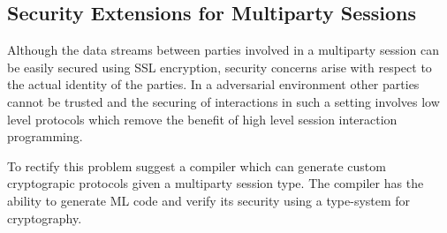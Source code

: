 \subsection*{Security Extensions for Multiparty Sessions}

Although the data streams between parties involved in a multiparty session can be easily secured using SSL encryption, security concerns arise with respect to the actual identity of the parties. In a adversarial environment other parties cannot be trusted and the securing of interactions in such a setting involves low level protocols which remove the benefit of high level session interaction programming. 

To rectify this problem \cite{crypto_mpst1, crypto_mpst2} suggest a compiler which can generate custom cryptograpic protocols given a multiparty session type. The compiler has the ability to generate ML code and verify its security using a type-system for cryptography.




%


